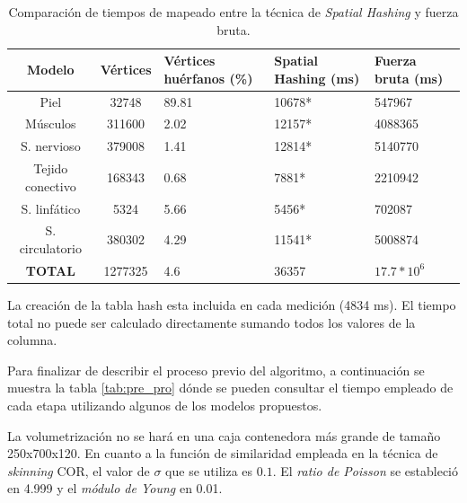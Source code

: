 \begin{table}[h]

\begin{threeparttable}
\centering

\caption{Comparación de tiempos de mapeado entre la técnica de \emph{Spatial Hashing} y fuerza bruta. }
\label{tab:bruteforce}
\begin{tabular}{|c|c|x{25mm}|x{25mm}|x{25mm}|}

\hline
\textbf{Modelo} & \textbf{Vértices} & \textbf{Vértices  huérfanos (\%)}  & \textbf{Spatial Hashing (ms)} & \textbf{Fuerza bruta (ms)} \\ 
\hline
Piel             &32748      &89.81   &10678* &547967\\
\hline
Músculos         &311600     &2.02    &12157* &4088365\\ 
\hline
S. nervioso      &379008     &1.41    &12814* &5140770\\ 
\hline
Tejido conectivo &168343     &0.68    &7881*  &2210942\\ 
\hline
S. linfático     &5324       &5.66    &5456*  &702087\\ 
\hline
S. circulatorio  &380302     &4.29    &11541* &5008874\\ 
\hline
\textbf{TOTAL}   &1277325    &4.6     &36357  &$17.7*10^6$ \\
\hline

\end{tabular}
\begin{tablenotes}
      \small
      \item * La creación de la \ac{tabla hash} esta incluida en cada medición (4834 ms). El tiempo total no puede ser calculado directamente sumando todos los valores de la columna.
    \end{tablenotes}

\end{threeparttable}
\end{table}


Para finalizar de describir el proceso previo del algoritmo, a continuación se muestra la tabla \ref{tab:pre_pro} dónde se pueden consultar el tiempo empleado de cada etapa utilizando algunos de los modelos propuestos. 


La volumetrización no se hará en una caja contenedora más grande de tamaño 250x700x120. En cuanto a la función de similaridad empleada en la técnica de \emph{skinning} \ac{COR}, el valor de $\sigma$ que se utiliza es $0.1$. El \emph{ratio de Poisson} se estableció en 4.999 y el \emph{módulo de Young} en 0.01.





